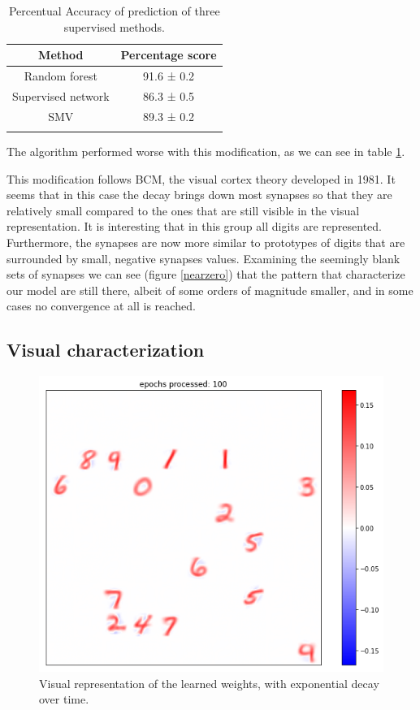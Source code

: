 \documentclass[a4paper]{report}
\begin{document}
\begin{table}[h!]
  \begin{center}
    \caption{Percentual Accuracy of prediction of three supervised methods.}
    \begin{tabular}{c|c} %
      \textbf{Method} & \textbf{Percentage score}\\
      \hline
      Random forest & 91.6  ± 0.2\\
      Supervised network & 86.3 ± 0.5\\
      SMV & 89.3 ± 0.2\\
        \label{decayT}
    \end{tabular}
  \end{center}
\end{table}

The algorithm performed worse with this modification, as we can see in table \ref{decayT}.

This modification follows BCM, the visual cortex theory developed in 1981.
It seems that in this case the decay brings down most synapses so that they are relatively small compared to the ones that are still visible in the visual representation.
It is interesting that in this group all digits are represented.
Furthermore, the synapses are now more similar to prototypes of digits that are surrounded by small, negative synapses values.
Examining the seemingly blank sets of synapses we can see (figure \ref{nearzero}) that the pattern that characterize our model are still there, albeit of some orders of magnitude smaller, and in some cases no convergence at all is reached.

\subsection{Visual characterization}

\begin{figure} [H]
\centering
\includegraphics [width=12cm ] {h/cento.png}
\caption{Visual representation of the learned weights, with exponential decay over time.}
\label{decay}
\end{figure}
\end{document}

